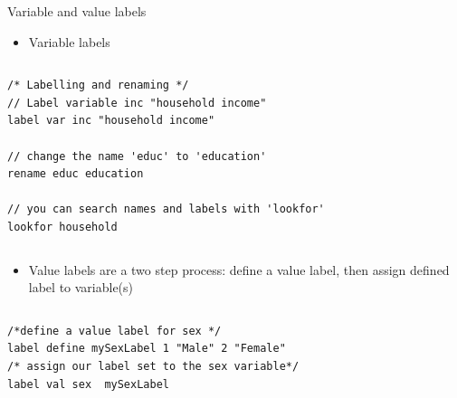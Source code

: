 \documentclass[table,smaller]{beamer}
\begin{document}
\begin{frame}[fragile,label=sec-4-2]{Variable and value labels}
 \begin{itemize}
\item Variable labels
\end{itemize}
\vspace{-.5em} \begin{columns}  \begin{block}{}
\begin{verbatim}
/* Labelling and renaming */
// Label variable inc "household income"
label var inc "household income"

// change the name 'educ' to 'education'
rename educ education

// you can search names and labels with 'lookfor' 
lookfor household
\end{verbatim}

\end{block} \end{columns}

\begin{itemize}
\item Value labels are a two step process: define a value label, then assign defined label to variable(s)
\end{itemize}

\vspace{-.5em} \begin{columns}  \begin{block}{}
\begin{verbatim}
/*define a value label for sex */
label define mySexLabel 1 "Male" 2 "Female"
/* assign our label set to the sex variable*/
label val sex  mySexLabel
\end{verbatim}

\end{block} \end{columns}
\end{frame}
\end{document}
